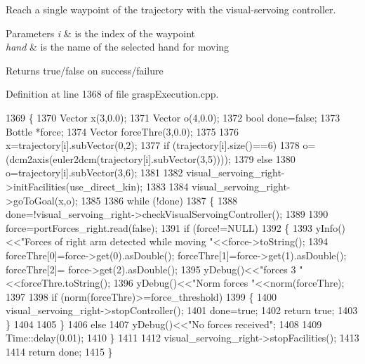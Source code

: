 Reach a single waypoint of the trajectory with the visual-\/servoing controller. 


\begin{DoxyParams}{Parameters}
{\em i} & is the index of the waypoint \\
\hline
{\em hand} & is the name of the selected hand for moving \\
\hline
\end{DoxyParams}
\begin{DoxyReturn}{Returns}
true/false on success/failure 
\end{DoxyReturn}


Definition at line 1368 of file grasp\+Execution.\+cpp.


\begin{DoxyCode}
1369 \{
1370     Vector x(3,0.0);
1371     Vector o(4,0.0);
1372     \textcolor{keywordtype}{bool} done=\textcolor{keyword}{false};
1373     Bottle *force;
1374     Vector forceThre(3,0.0);
1375 
1376     x=trajectory[i].subVector(0,2);
1377     \textcolor{keywordflow}{if} (trajectory[i].size()==6)
1378         o=(dcm2axis(euler2dcm(trajectory[i].subVector(3,5))));
1379     \textcolor{keywordflow}{else}
1380         o=trajectory[i].subVector(3,6);
1381 
1382     visual_servoing_right->initFacilities(use_direct_kin);
1383 
1384     visual_servoing_right->goToGoal(x,o);
1385     
1386     \textcolor{keywordflow}{while} (!done)
1387     \{
1388         done=!visual_servoing_right->checkVisualServoingController();
1389 
1390         force=portForces_right.read(\textcolor{keyword}{false});
1391         \textcolor{keywordflow}{if} (force!=NULL)
1392         \{
1393             yInfo()<<\textcolor{stringliteral}{"Forces of right arm detected while moving     "}<<force->toString();
1394             forceThre[0]=force->get(0).asDouble();  forceThre[1]=force->get(1).asDouble();  forceThre[2]=
      force->get(2).asDouble();       
1395             yDebug()<<\textcolor{stringliteral}{"forces 3 "}<<forceThre.toString();  
1396             yDebug()<<\textcolor{stringliteral}{"Norm forces "}<<norm(forceThre);  
1397 
1398             \textcolor{keywordflow}{if} (norm(forceThre)>=force_threshold)
1399             \{
1400                  visual_servoing_right->stopController();
1401                  done=\textcolor{keyword}{true};
1402                  \textcolor{keywordflow}{return} \textcolor{keyword}{true};
1403             \}
1404             
1405         \}
1406         \textcolor{keywordflow}{else}
1407             yDebug()<<\textcolor{stringliteral}{"No forces received"};
1408 
1409         Time::delay(0.01);
1410     \}
1411 
1412     visual_servoing_right->stopFacilities();
1413 
1414     \textcolor{keywordflow}{return} done;
1415 \}
\end{DoxyCode}

